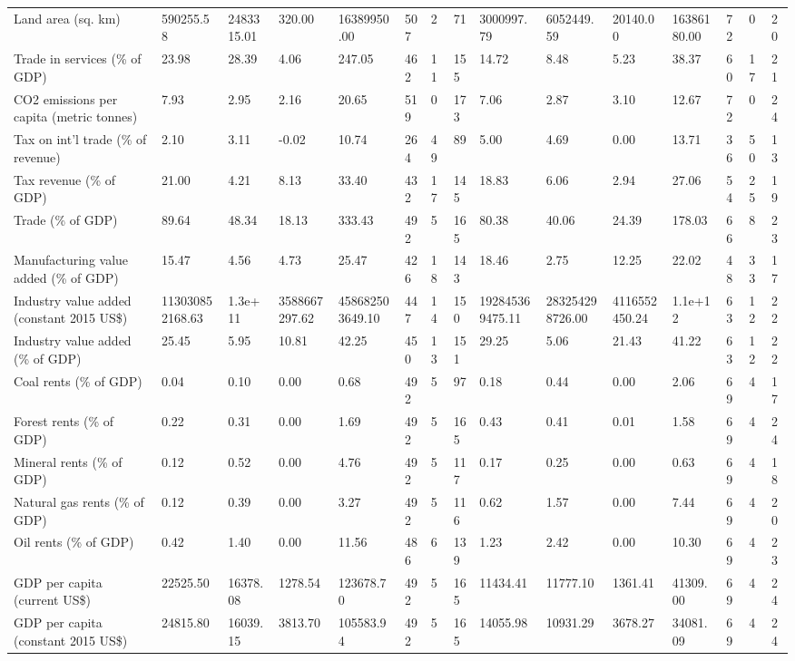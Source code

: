 \begin{longtable}{lllllllllllllll}
Land area (sq. km) & 590255.58 & 2483315.01 & 320.00 & 16389950.00 & 507 & 2 & 71 & 3000997.79 & 6052449.59 & 20140.00 & 16386180.00 & 72 & 0 & 20\\
Trade in services (\% of GDP) & 23.98 & 28.39 & 4.06 & 247.05 & 462 & 11 & 155 & 14.72 & 8.48 & 5.23 & 38.37 & 60 & 17 & 21\\
\addlinespace
CO2 emissions per capita (metric tonnes) & 7.93 & 2.95 & 2.16 & 20.65 & 519 & 0 & 173 & 7.06 & 2.87 & 3.10 & 12.67 & 72 & 0 & 24\\
Tax on int'l trade (\% of revenue) & 2.10 & 3.11 & -0.02 & 10.74 & 264 & 49 & 89 & 5.00 & 4.69 & 0.00 & 13.71 & 36 & 50 & 13\\
Tax revenue (\% of GDP) & 21.00 & 4.21 & 8.13 & 33.40 & 432 & 17 & 145 & 18.83 & 6.06 & 2.94 & 27.06 & 54 & 25 & 19\\
Trade (\% of GDP) & 89.64 & 48.34 & 18.13 & 333.43 & 492 & 5 & 165 & 80.38 & 40.06 & 24.39 & 178.03 & 66 & 8 & 23\\
Manufacturing value added (\% of GDP) & 15.47 & 4.56 & 4.73 & 25.47 & 426 & 18 & 143 & 18.46 & 2.75 & 12.25 & 22.02 & 48 & 33 & 17\\
\addlinespace
Industry value added (constant 2015 US\$) & 113030852168.63 & 1.3e+11 & 3588667297.62 & 458682503649.10 & 447 & 14 & 150 & 192845369475.11 & 283254298726.00 & 4116552450.24 & 1.1e+12 & 63 & 12 & 22\\
Industry value added (\% of GDP) & 25.45 & 5.95 & 10.81 & 42.25 & 450 & 13 & 151 & 29.25 & 5.06 & 21.43 & 41.22 & 63 & 12 & 22\\
Coal rents (\% of GDP) & 0.04 & 0.10 & 0.00 & 0.68 & 492 & 5 & 97 & 0.18 & 0.44 & 0.00 & 2.06 & 69 & 4 & 17\\
Forest rents (\% of GDP) & 0.22 & 0.31 & 0.00 & 1.69 & 492 & 5 & 165 & 0.43 & 0.41 & 0.01 & 1.58 & 69 & 4 & 24\\
Mineral rents (\% of GDP) & 0.12 & 0.52 & 0.00 & 4.76 & 492 & 5 & 117 & 0.17 & 0.25 & 0.00 & 0.63 & 69 & 4 & 18\\
\addlinespace
Natural gas rents (\% of GDP) & 0.12 & 0.39 & 0.00 & 3.27 & 492 & 5 & 116 & 0.62 & 1.57 & 0.00 & 7.44 & 69 & 4 & 20\\
Oil rents (\% of GDP) & 0.42 & 1.40 & 0.00 & 11.56 & 486 & 6 & 139 & 1.23 & 2.42 & 0.00 & 10.30 & 69 & 4 & 23\\
GDP per capita (current US\$) & 22525.50 & 16378.08 & 1278.54 & 123678.70 & 492 & 5 & 165 & 11434.41 & 11777.10 & 1361.41 & 41309.00 & 69 & 4 & 24\\
GDP per capita (constant 2015 US\$) & 24815.80 & 16039.15 & 3813.70 & 105583.94 & 492 & 5 & 165 & 14055.98 & 10931.29 & 3678.27 & 34081.09 & 69 & 4 & 24\\

\end{longtable}

